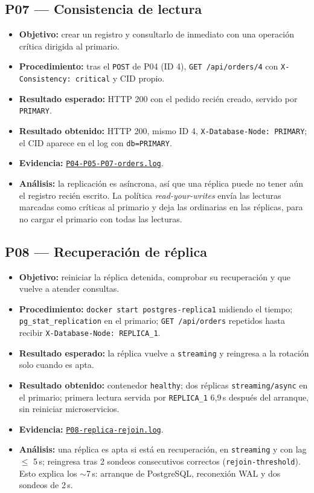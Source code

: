 \documentclass[
  spanish,
  a4paper,
  11pt
]{article}
\providecommand{\tightlist}{\setlength{\itemsep}{0pt}\setlength{\parskip}{0pt}}
\newcommand{\evid}[1]{\href{https://github.com/yan2005dris-afk/SDCC---microservices-with-gateway-and-loadbalancer/blob/develop/docs/evidencias/#1}{{\urlstyle{tt}\nolinkurl{#1}}}}
\begin{document}
\subsection{P07 --- Consistencia de lectura}
\begin{itemize}
\tightlist
\item \textbf{Objetivo:} crear un registro y consultarlo de inmediato con una operación crítica dirigida al primario.
\item \textbf{Procedimiento:} tras el \texttt{POST} de P04 (ID 4), \texttt{GET /api/orders/4} con \texttt{X-Consistency: critical} y CID propio.
\item \textbf{Resultado esperado:} HTTP 200 con el pedido recién creado, servido por \texttt{PRIMARY}.
\item \textbf{Resultado obtenido:} HTTP 200, mismo ID 4, \texttt{X-Database-Node: PRIMARY}; el CID aparece en el log con \texttt{db=PRIMARY}.
\item \textbf{Evidencia:} \evid{P04-P05-P07-orders.log}.
\item \textbf{Análisis:} la replicación es asíncrona, así que una réplica puede no tener aún el registro recién escrito. La política \emph{read-your-writes} envía las lecturas marcadas como críticas al primario y deja las ordinarias en las réplicas, para no cargar el primario con todas las lecturas.
\end{itemize}

\subsection{P08 --- Recuperación de réplica}
\begin{itemize}
\tightlist
\item \textbf{Objetivo:} reiniciar la réplica detenida, comprobar su recuperación y que vuelve a atender consultas.
\item \textbf{Procedimiento:} \texttt{docker start postgres-replica1} midiendo el tiempo; \texttt{pg\_stat\_replication} en el primario; \texttt{GET /api/orders} repetidos hasta recibir \texttt{X-Database-Node: REPLICA\_1}.
\item \textbf{Resultado esperado:} la réplica vuelve a \texttt{streaming} y reingresa a la rotación solo cuando es apta.
\item \textbf{Resultado obtenido:} contenedor \texttt{healthy}; dos réplicas \texttt{streaming/async} en el primario; primera lectura servida por \texttt{REPLICA\_1} 6,9\,s después del arranque, sin reiniciar microservicios.
\item \textbf{Evidencia:} \evid{P08-replica-rejoin.log}.
\item \textbf{Análisis:} una réplica es apta si está en recuperación, en \texttt{streaming} y con lag $\le$ 5\,s; reingresa tras 2 sondeos consecutivos correctos (\texttt{rejoin-threshold}). Esto explica los $\sim$7\,s: arranque de PostgreSQL, reconexión WAL y dos sondeos de 2\,s.
\end{itemize}
\end{document}
